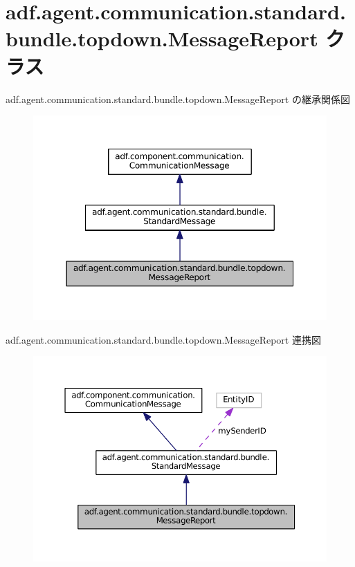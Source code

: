 \hypertarget{classadf_1_1agent_1_1communication_1_1standard_1_1bundle_1_1topdown_1_1MessageReport}{}\section{adf.\+agent.\+communication.\+standard.\+bundle.\+topdown.\+Message\+Report クラス}
\label{classadf_1_1agent_1_1communication_1_1standard_1_1bundle_1_1topdown_1_1MessageReport}


adf.\+agent.\+communication.\+standard.\+bundle.\+topdown.\+Message\+Report の継承関係図
\nopagebreak
\begin{figure}[H]
\begin{center}
\leavevmode
\includegraphics[width=350pt]{classadf_1_1agent_1_1communication_1_1standard_1_1bundle_1_1topdown_1_1MessageReport__inherit__graph}
\end{center}
\end{figure}


adf.\+agent.\+communication.\+standard.\+bundle.\+topdown.\+Message\+Report 連携図
\nopagebreak
\begin{figure}[H]
\begin{center}
\leavevmode
\includegraphics[width=350pt]{classadf_1_1agent_1_1communication_1_1standard_1_1bundle_1_1topdown_1_1MessageReport__coll__graph}
\end{center}
\end{figure}
